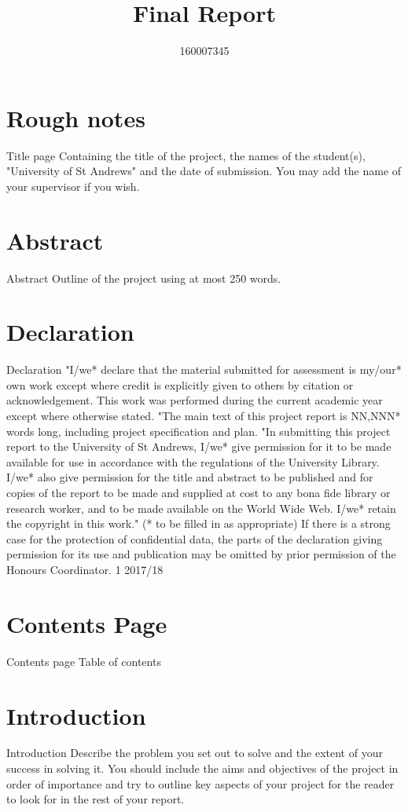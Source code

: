 \documentclass[11pt,a4paper,notitlepage]{report}
\author{160007345}
\title{Final Report}
\begin{document}
	\maketitle
	\section*{Rough notes}
	Title page
	Containing the title of the project, the names of the
	student(s), "University of St Andrews" and the date of
	submission. You may add the name of your supervisor
	if you wish.
	
	\section*{Abstract}
	Abstract Outline of the project using at most 250 words.
	
	\section*{Declaration}
	Declaration
	"I/we* declare that the material submitted for
	assessment is my/our* own work except where credit is
	explicitly given to others by citation or
	acknowledgement. This work was performed during
	the current academic year except where otherwise
	stated.
	"The main text of this project report is NN,NNN*
	words long, including project specification and plan.
	"In submitting this project report to the University of
	St Andrews, I/we* give permission for it to be made
	available for use in accordance with the regulations of
	the University Library. I/we* also give permission for
	the title and abstract to be published and for copies of
	the report to be made and supplied at cost to any bona
	fide library or research worker, and to be made
	available on the World Wide Web. I/we* retain the
	copyright in this work."
	(* to be filled in as appropriate)
	If there is a strong case for the protection of
	confidential data, the parts of the declaration giving
	permission for its use and publication may be omitted
	by prior permission of the Honours Coordinator.
	1
	2017/18
	
	\section*{Contents Page}
	Contents page Table of contents
	
	\section*{Introduction}
		Introduction
	Describe the problem you set out to solve and the
	extent of your success in solving it. You should include
	the aims and objectives of the project in order of
	importance and try to outline key aspects of your
	project for the reader to look for in the rest of your
	report.
	
\end{document}
